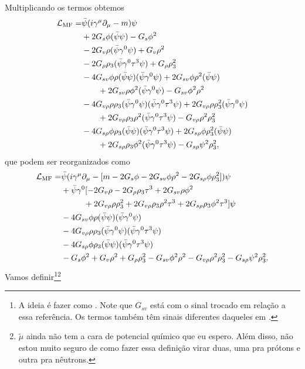 %
Multiplicando os termos obtemos
\begin{equation}
\begin{split}
\mathcal{L}_{\rm{MF}} =& \bar{\psi}(i\gamma^\mu\partial_\mu - m)\psi \\
& + 2 G_s \phi (\bar\psi\psi) - G_s\phi^2 \\
& - 2G_v\rho(\bar\psi\gamma^0\psi) + G_v\rho^2 \\
& - 2G_\rho\rho_3(\bar\psi\gamma^0\tau^3\psi) + G_{\rho}\rho_3^2 \\
& - 4G_{sv}\phi\rho(\bar\psi\psi)(\bar\psi\gamma^0\psi) + 2G_{sv}\phi\rho^2(\bar\psi\psi) \\
&\qquad + 2G_{sv}\rho\phi^2(\bar\psi\gamma^0\psi) - G_{sv}\phi^2\rho^2 \\
& - 4G_{v\rho}\rho\rho_3(\bar\psi\gamma^0\psi)(\bar\psi\gamma^0\tau^3\psi) + 2G_{v\rho}\rho \rho_3^2 (\bar\psi\gamma^0\psi) \\
& \qquad + 2G_{v\rho}\rho_3\rho^2(\bar\psi\gamma^0\tau^3\psi) - G_{v\rho}\rho^2\rho_3^2 \\
& -4G_{s\rho} \phi\rho_3(\bar\psi\psi)(\bar\psi\gamma^0\tau^3\psi) + 2G_{s\rho}\phi\rho_3^2(\bar\psi\psi) \\
&\qquad + 2G_{s\rho}\rho_3\phi^2(\bar\psi\gamma^0\tau^3\psi) - G_{s\rho}\psi^2\rho_3^2,
\end{split}
\end{equation}
%
que podem ser reorganizados como
\begin{equation}
\begin{split}
\mathcal{L}_{\rm{MF}} =& \bar{\psi}(i\gamma^\mu\partial_\mu - [m - 2 G_s \phi - 2G_{sv}\phi\rho^2 - 2G_{s\rho}\phi\rho_3^2])\psi \\
& + \bar\psi\gamma^0 [- 2G_v\rho - 2G_\rho\rho_3\tau^3 + 2G_{sv}\rho\phi^2 \\
&\phantom{+  \bar\psi\gamma^0 [}+ 2G_{v\rho}\rho \rho_3^2 + 2G_{v\rho}\rho_3\rho^2\tau^3 + 2G_{s\rho}\rho_3\phi^2\tau^3 ]\psi \\
& - 4G_{sv}\phi\rho(\bar\psi\psi)(\bar\psi\gamma^0\psi) \\
& - 4G_{v\rho}\rho\rho_3(\bar\psi\gamma^0\psi)(\bar\psi\gamma^0\tau^3\psi) \\
& - 4G_{s\rho} \phi\rho_3(\bar\psi\psi)(\bar\psi\gamma^0\tau^3\psi) \\
& - G_s\phi^2 + G_v\rho^2 + G_{\rho}\rho_3^2 - G_{sv}\phi^2\rho^2- G_{v\rho}\rho^2\rho_3^2 - G_{s\rho}\psi^2\rho_3^2.
\end{split}
\end{equation}
%
Vamos definir\footnote[][-5cm]{A ideia é fazer como \cite{japoneses}. Note que $G_{sv}$ está com o sinal trocado em relação a essa referência. Os termos também têm sinais diferentes daqueles em \cite{Pais}.}\footnote[][-3cm]{$\tilde\mu$ ainda não tem a cara de potencial químico que eu espero. Além disso, não estou muito seguro de como fazer essa definição virar duas, uma pra prótons e outra pra nêutrons.}
